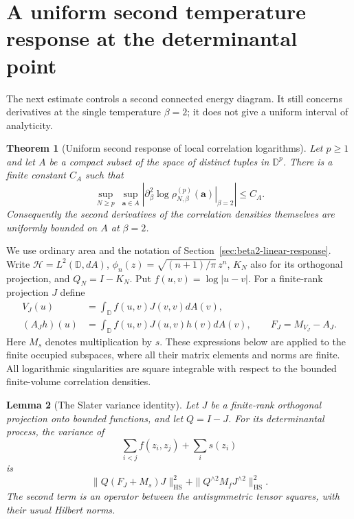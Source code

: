 \documentclass[11pt,a4paper]{article}
\numberwithin{equation}{section}
\newtheorem{theorem}{Theorem}[section]
\newtheorem{lemma}[theorem]{Lemma}
\theoremstyle{definition}
\theoremstyle{remark}
\newcommand{\D}{\mathbb D}
\begin{document}
\section{A uniform second temperature response at the determinantal point}
\label{sec:beta2-second-response}

The next estimate controls a second connected energy diagram.  It
still concerns derivatives at the single temperature $\beta=2$;
it does not give a uniform interval of analyticity.

\begin{theorem}[Uniform second response of local correlation logarithms]
\label{thm:beta2-second-response}
Let $p\ge1$ and let $A$ be a compact subset of the space of distinct
tuples in $\D^p$.  There is a finite constant $C_A$ such that
\begin{equation}
 \sup_{N\ge p}\ \sup_{\mathbf a\in A}
 \left|\left.\partial_\beta^2
       \log\rho_{N,\beta}^{(p)}(\mathbf a)\right|_{\beta=2}\right|
 \le C_A.
 \label{eq:beta2-second-response}
\end{equation}
Consequently the second derivatives of the correlation densities
themselves are uniformly bounded on $A$ at $\beta=2$.
\end{theorem}

We use ordinary area and the notation of
Section~\ref{sec:beta2-linear-response}.  Write $\mathcal H=L^2(\D,dA)$,
$\phi_n(z)=\sqrt{(n+1)/\pi}\,z^n$, $K_N$ also for its orthogonal
projection, and $Q_N=I-K_N$.  Put $f(u,v)=\log|u-v|$.  For a finite-rank
projection $J$ define
\begin{align*}
 V_J(u)&=\int_\D f(u,v)J(v,v)dA(v),\\
 (A_Jh)(u)&=\int_\D f(u,v)J(u,v)h(v)dA(v),
 \qquad F_J=M_{V_J}-A_J.
\end{align*}
Here $M_s$ denotes multiplication by $s$.  These expressions below
are applied to the finite occupied subspaces, where all their
matrix elements and norms are finite.  All logarithmic singularities
are square integrable with respect to the bounded finite-volume
correlation densities.

\begin{lemma}[The Slater variance identity]
\label{lem:beta2-slater-variance}
Let $J$ be a finite-rank orthogonal projection onto bounded functions,
and let $Q=I-J$.  For its determinantal process, the variance of
\[
 \sum_{i<j}f(z_i,z_j)+\sum_i s(z_i)
\]
is
\begin{equation}
 \|Q(F_J+M_s)J\|_{\mathrm{HS}}^2+
 \|Q^{\wedge2}M_fJ^{\wedge2}\|_{\mathrm{HS}}^2.
 \label{eq:beta2-slater-variance}
\end{equation}
The second term is an operator between the antisymmetric tensor
squares, with their usual Hilbert norms.
\end{lemma}
\end{document}
